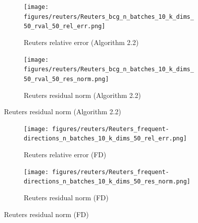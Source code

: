 \begin{figure}
\begin{subfigure}[b]{0.48\textwidth}
  \end{subfigure}
    \begin{subfigure}[b]{0.48\textwidth}
    \centering
    \texttt{[image: figures/reuters/Reuters\_bcg\_n\_batches\_10\_k\_dims\_50\_rval\_50\_rel\_err.png]}
    \caption{Reuters relative error (Algorithm 2.2)}
  \end{subfigure}
  \hfill
  \begin{subfigure}[b]{0.48\textwidth}
    \centering
    \texttt{[image: figures/reuters/Reuters\_bcg\_n\_batches\_10\_k\_dims\_50\_rval\_50\_res\_norm.png]}
    \caption{Reuters residual norm (Algorithm 2.2)}
  \end{subfigure}
 \end{figure}
 
 \begin{figure}\ContinuedFloat
  \begin{subfigure}[b]{0.48\textwidth}
    \centering
    \texttt{[image: figures/reuters/Reuters\_frequent-directions\_n\_batches\_10\_k\_dims\_50\_rel\_err.png]}
    \caption{Reuters relative error (FD)}
  \end{subfigure}
  \hfill
  \begin{subfigure}[b]{0.48\textwidth}
    \centering
    \texttt{[image: figures/reuters/Reuters\_frequent-directions\_n\_batches\_10\_k\_dims\_50\_res\_norm.png]}
    \caption{Reuters residual norm (FD)}
  \end{subfigure}
\end{figure}
